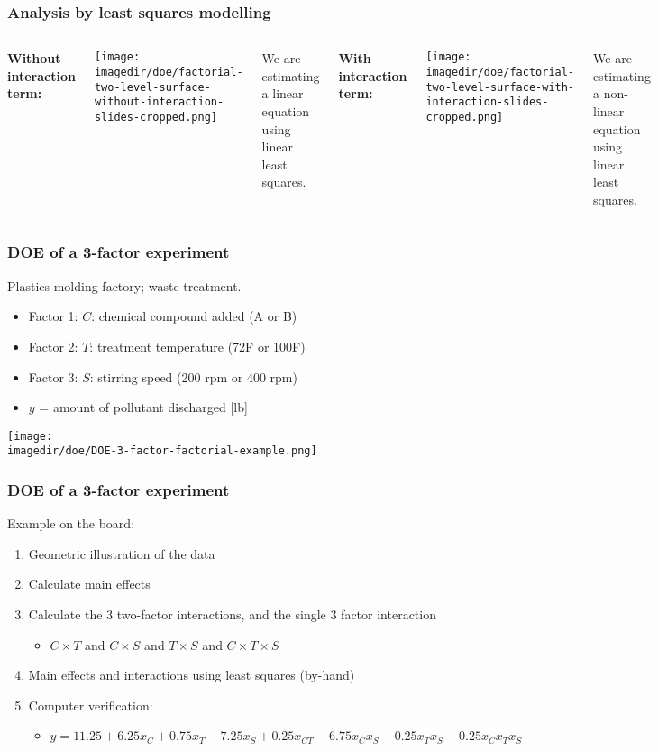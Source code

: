 \begin{frame}\frametitle{Analysis by least squares modelling}
	\begin{columns}
		\column{5cm} 
			\textbf{Without interaction term:}
			\begin{center}
				\texttt{[image: \\imagedir/doe/factorial-two-level-surface-without-interaction-slides-cropped.png]}
			\end{center}
			We are estimating a linear equation using linear least squares. 
		
		\column{5cm} 
			\textbf{With interaction term:}
			\begin{center}
				\texttt{[image: \\imagedir/doe/factorial-two-level-surface-with-interaction-slides-cropped.png]}
			\end{center}
			We are estimating a non-linear equation using linear least squares.
	\end{columns}
\end{frame}

\begin{frame}\frametitle{DOE of a 3-factor experiment}

	Plastics molding factory; waste treatment.
	\begin{itemize}
		\item	Factor 1: $C$: chemical compound added (A or B)
		\item	Factor 2: $T$: treatment temperature (72F or 100F)
		\item	Factor 3: $S$: stirring speed (200 rpm or 400 rpm)
		\item	$y$ = amount of pollutant discharged [lb]
	\end{itemize}
	\begin{center}
		\texttt{[image: \\imagedir/doe/DOE-3-factor-factorial-example.png]}
	\end{center}
\end{frame}

\begin{frame}\frametitle{DOE of a 3-factor experiment}

	Example on the board:
	\begin{enumerate}
		\item	Geometric illustration of the data
		\item	Calculate main effects
		\item	Calculate the 3 two-factor interactions, and the single 3 factor interaction
		\begin{itemize}
			\item	$C \times T$ and $C \times S$ and $T \times S$ and $C \times T \times S$
		\end{itemize}
		\item	Main effects and interactions using least squares (by-hand)
		\item	Computer verification:
		\begin{itemize}
			\item	$y = 11.25 + 6.25x_C + 0.75x_T -7.25x_S + 0.25 x_{CT} -6.75 x_C x_S -0.25 x_T x_S - 0.25 x_Cx_Tx_S$
		\end{itemize}
	\end{enumerate}
\end{frame}


